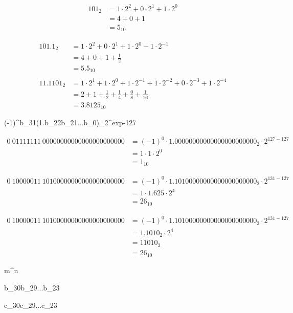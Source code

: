 \begin{align*}
101_2 &= 1\cdot2^2 + 0\cdot2^1 + 1\cdot2^0 \\
      &= 4 + 0 + 1 \\
&= 5_{10}
\end{align*}

\begin{align*}
101.1_2 &= 1\cdot2^2 + 0\cdot2^1 + 1\cdot2^0 + 1\cdot2^{-1} \\
&= 4 + 0 + 1 + \frac{1}{2} \\
&= 5.5_{10} \\
\\
11.1101_2 &= 1\cdot2^1 + 1\cdot2^0 + 1\cdot2^{-1} + 1\cdot2^{-2} + 0\cdot2^{-3} + 1\cdot2^{-4}\\
&= 2 + 1 + \frac{1}{2} + \frac{1}{4} + \frac{0}{8} + \frac{1}{16}\\
&= 3.8125_{10}
\end{align*}

(-1)^{b_{31}}\cdot(1.b_{22}b_{21}...b_0)_2^{exp-127}

\begin{align*}
0\ 01111111\ 00000000000000000000000 &= (-1)^0 \cdot 1.00000000000000000000000_2 \cdot 2 ^ {127 - 127} \\
&= 1 \cdot 1 \cdot 2 ^ 0 \\
&= 1_{10}
\end{align*}

\begin{align*}
0\ 10000011\ 10100000000000000000000 &= (-1)^0 \cdot 1.10100000000000000000000_2 \cdot 2 ^ {131 - 127}\\
&= 1 \cdot 1.625 \cdot 2^4 \\
&= 26_{10}
\end{align*}

\begin{align*}
0\ 10000011\ 10100000000000000000000 &= (-1)^0 \cdot 1.10100000000000000000000_2 \cdot 2 ^ {131 - 127}\\
&= 1.1010_2 \cdot 2^4 \\
&= 11010_2\\
&= 26_{10}
\end{align*}

m^n

b_{30}b_{29}...b_{23}

c_{30}c_{29}...c_{23}
